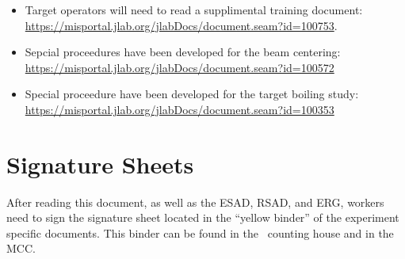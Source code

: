 \begin{itemize}

\item{
Target operators will need to read a supplimental training document:
\url{https://misportal.jlab.org/jlabDocs/document.seam?id=100753}.
}

\item{
Sepcial proceedures have been developed for the beam centering:
\url{ https://misportal.jlab.org/jlabDocs/document.seam?id=100572}
}

\item{
Special proceedure have been developed for the target boiling study:
\url{https://misportal.jlab.org/jlabDocs/document.seam?id=100353}
}

\end{itemize}


\newpage
\section{Signature Sheets}

After reading this document, as well as the ESAD, RSAD, and ERG, workers need to sign
the signature sheet located in the ``yellow binder'' of the experiment specific documents.
This binder can be found in the \HALL\ counting house and in the MCC.

